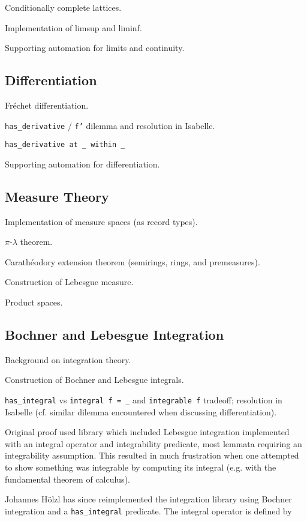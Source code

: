 \documentclass{amsart}
\theoremstyle{definition}
\theoremstyle{remark}
\begin{document}
Conditionally complete lattices.

Implementation of limsup and liminf.

Supporting automation for limits and continuity.

\subsection{Differentiation}

Fr\'echet differentiation.

\texttt{has\_derivative} / \texttt{f'} dilemma and resolution in Isabelle.

\texttt{has\_derivative at \_ within \_}

Supporting automation for differentiation.

\subsection{Measure Theory}

Implementation of measure spaces (as record types).

$\pi$-$\lambda$ theorem.

Carath\'eodory extension theorem (semirings, rings, and premeasures).

Construction of Lebesgue measure.

Product spaces.

\subsection{Bochner and Lebesgue Integration}

Background on integration theory.

Construction of Bochner and Lebesgue integrals.

\texttt{has\_integral} vs \texttt{integral f = \_} and \texttt{integrable f} tradeoff; resolution in Isabelle (cf. similar dilemma encountered when discussing differentiation).

Original proof used library which included Lebesgue integration implemented with an integral operator and integrability predicate, most lemmata requiring an integrability assumption. This resulted in much frustration when one attempted to show something was integrable by computing its integral (e.g. with the fundamental theorem of calculus).

Johannes H\"olzl has since reimplemented the integration library using Bochner integration and a \texttt{has\_integral} predicate. The integral operator is defined by
\end{document}
